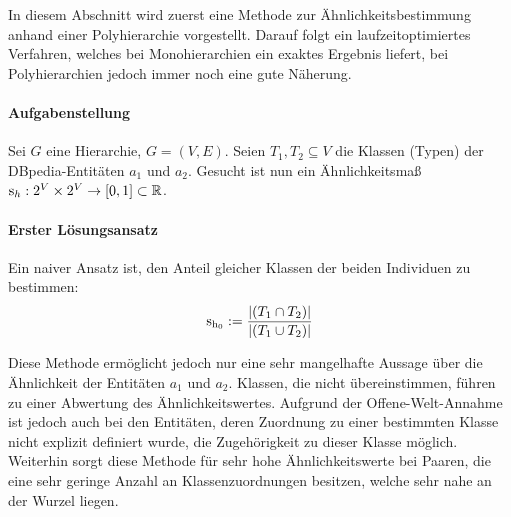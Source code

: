 In diesem Abschnitt wird zuerst eine Methode zur Ähnlichkeitsbestimmung anhand einer Polyhierarchie vorgestellt.
Darauf folgt ein laufzeitoptimiertes Verfahren, welches bei Monohierarchien ein exaktes Ergebnis liefert, bei Polyhierarchien jedoch immer noch eine gute Näherung.

\paragraph{Aufgabenstellung}
Sei $G$ eine Hierarchie, $G = (V,E)$.
Seien $T_1, T_2 \subseteq V$ die Klassen (Typen) der DBpedia-Entitäten $a_1$ und $a_2$. %
Gesucht ist nun ein Ähnlichkeitsmaß $\textnormal{s}_h: 2^V \times 2^V \rightarrow [0,1] \subset \mathbb{R}$.

\paragraph{Erster Lösungsansatz}
\newcommand{\snaiv}{\s_{\h_0}}
Ein naiver Ansatz ist, den Anteil gleicher Klassen der beiden Individuen zu bestimmen:
\begin{equation*}
\snaiv := \frac{|(T_1 \cap T_2)|}{|(T_1 \cup T_2)|} 
\end{equation*}

Diese Methode ermöglicht jedoch nur eine sehr mangelhafte Aussage über die Ähnlichkeit der Entitäten $a_1$ und $a_2$.
Klassen, die nicht übereinstimmen, führen zu einer Abwertung des Ähnlichkeitswertes.
Aufgrund der Offene-Welt-Annahme ist jedoch auch bei den Entitäten, deren Zuordnung zu einer bestimmten Klasse nicht explizit definiert wurde, die Zugehörigkeit zu dieser Klasse möglich.
Weiterhin sorgt diese Methode für sehr hohe Ähnlichkeitswerte bei Paaren, die eine sehr geringe Anzahl an Klassenzuordnungen besitzen, welche sehr nahe an der Wurzel liegen.

